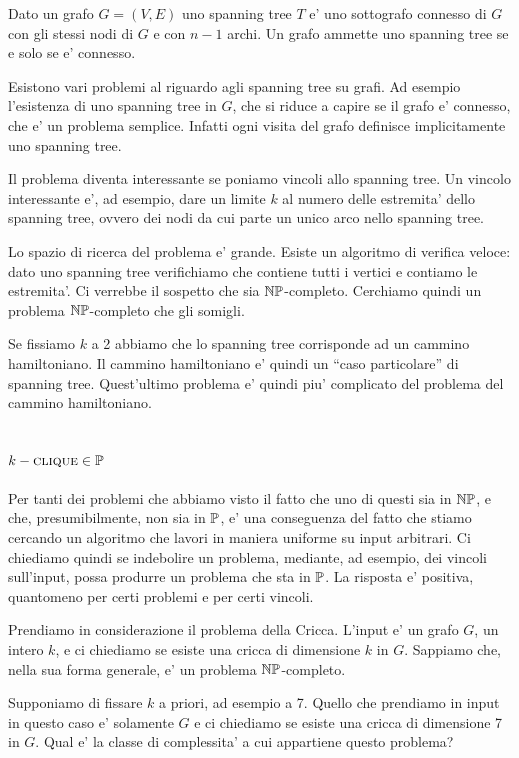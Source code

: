 Dato un grafo $G = (V,E)$ uno spanning tree $T$ e' uno sottografo connesso di $G$ con gli stessi
nodi di $G$ e con $n-1$ archi. Un grafo ammette uno spanning tree se e solo se e' connesso.

Esistono vari problemi al riguardo agli spanning tree su grafi. Ad esempio l'esistenza di uno
spanning tree in $G$, che si riduce a capire se il grafo e' connesso, che e' un problema semplice.
Infatti ogni visita del grafo definisce implicitamente uno spanning tree. 

Il problema diventa interessante se poniamo vincoli allo spanning tree. Un vincolo interessante e',
ad esempio, dare un limite $k$ al numero delle estremita' dello spanning tree, ovvero dei nodi da
cui parte un unico arco nello spanning tree.

Lo spazio di ricerca del problema e' grande. Esiste un algoritmo di verifica veloce: dato uno
spanning tree verifichiamo che contiene tutti i vertici e contiamo le estremita'. Ci verrebbe il
sospetto che sia $\mathbb{NP}$-completo. Cerchiamo quindi un problema $\mathbb{NP}$-completo che gli
somigli. 

Se fissiamo $k$ a 2 abbiamo che lo spanning tree corrisponde ad un cammino hamiltoniano. Il cammino
hamiltoniano e' quindi un ``caso particolare'' di spanning tree. Quest'ultimo problema e' quindi
piu' complicato del problema del cammino hamiltoniano.


\subsection{$k-\textsc{clique} \in \mathbb{P}$}

Per tanti dei problemi che abbiamo visto il fatto che uno di questi sia in $\mathbb{NP}$, e che,
presumibilmente, non sia in $\mathbb{P}$, e' una conseguenza del fatto che stiamo cercando un algoritmo
che lavori in maniera uniforme su input arbitrari. Ci chiediamo quindi se indebolire un problema,
mediante, ad esempio, dei vincoli sull'input, possa produrre un problema che sta in $\mathbb{P}$. La
risposta e' positiva, quantomeno per certi problemi e per certi vincoli.

Prendiamo in considerazione il problema della Cricca. L'input e' un grafo $G$, un intero $k$, e ci
chiediamo se esiste una cricca di dimensione $k$ in $G$. Sappiamo che, nella sua forma generale, e'
un problema $\mathbb{NP}$-completo.

Supponiamo di fissare $k$ a priori, ad esempio a 7. Quello che prendiamo in input in questo caso
e' solamente $G$ e ci chiediamo se esiste una cricca di dimensione 7 in $G$. Qual e' la classe di
complessita' a cui appartiene questo problema?

